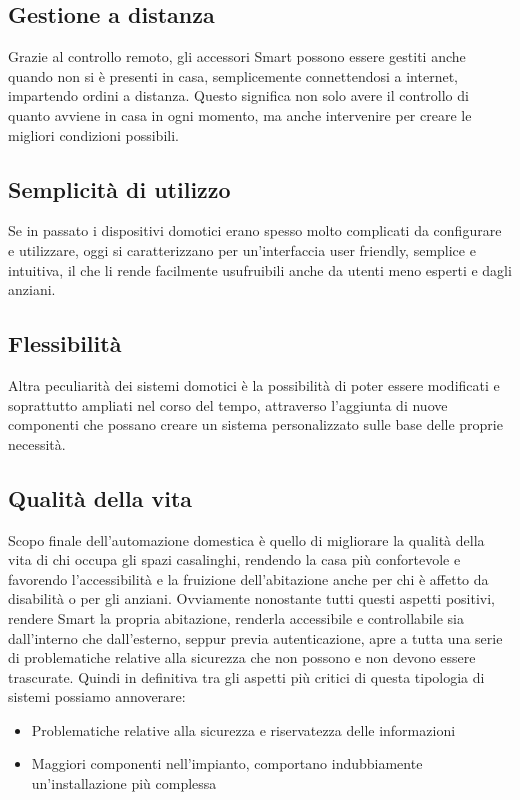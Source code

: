 \documentclass[12pt,a4paper]{report}
\begin{document}
\subsection{Gestione a distanza}
Grazie al controllo remoto, gli accessori Smart possono essere gestiti anche quando non si è presenti in casa, semplicemente connettendosi a internet, impartendo ordini a distanza. Questo significa non solo avere il controllo di quanto avviene in casa in ogni momento, ma anche intervenire per creare le migliori condizioni possibili.

\subsection{Semplicità di utilizzo}
Se in passato i dispositivi domotici erano spesso molto complicati da configurare e utilizzare, oggi si caratterizzano per un’interfaccia user friendly, semplice e intuitiva, il che li rende facilmente usufruibili anche da utenti meno esperti e dagli anziani.

\subsection{Flessibilità}
Altra peculiarità dei sistemi domotici è la possibilità di poter essere modificati e soprattutto ampliati nel corso del tempo, attraverso l’aggiunta di nuove componenti che possano creare un sistema personalizzato sulle base delle proprie necessità.

\subsection{Qualità della vita}
Scopo finale dell’automazione domestica è quello di migliorare la qualità della vita di chi occupa gli spazi casalinghi, rendendo la casa più confortevole e favorendo l’accessibilità e la fruizione dell’abitazione anche per chi è affetto da disabilità o per gli anziani.
Ovviamente nonostante tutti questi aspetti positivi, rendere Smart la propria abitazione, renderla accessibile e controllabile sia dall’interno che dall’esterno, seppur previa autenticazione, apre a tutta una serie di problematiche relative alla sicurezza che non possono e non devono essere trascurate.
Quindi in definitiva tra gli aspetti più critici di questa tipologia di sistemi possiamo annoverare:

\begin{itemize}
	\item Problematiche relative alla sicurezza e riservatezza delle informazioni
	\item Maggiori componenti nell’impianto, comportano indubbiamente un’installazione più complessa

\end{itemize}
\end{document}
